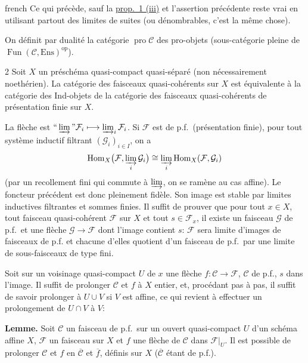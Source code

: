 \begin{hyphenrules}{french}
Ce qui pr\'ec\`ede, sauf la \hyperref[app:prop1]{prop.\ 1 (iii)} et l'assertion pr\'ec\'edente reste vrai en utilisant partout des limites de suites (ou d\'enombrables, c'est la m\^eme chose).

On d\'efinit par dualit\'e la cat\'egorie $\operatorname{pro}\mathcal{C}$ des pro-objets (sous-cat\'egorie pleine de $\operatorname{Fun}(\mathcal C,\mathrm{Ens})^{\mathrm{op}}$).

\begin{bookproposition}{2}\label{app:prop2}
Soit $X$ un pr\'esch\'ema quasi-compact quasi-s\'epar\'e (non n\'ecessairement noeth\'erien). La cat\'egorie des faisceaux quasi-coh\'erents sur $X$ est \'equivalente \`a la cat\'egorie des Ind-objets de la cat\'egorie des faisceaux quasi-coh\'erents de pr\'esentation finie sur $X$.
\end{bookproposition}

La fl\`eche est $\text{``}\varinjlim\text{''}\mathcal F_i\longmapsto\varinjlim_i\mathcal F_i$. Si $\mathcal F$ est de p.f.\ (pr\'esentation finie), pour tout syst\`eme inductif filtrant $(\mathcal G_i)_{i\in I}$, on a
\[
\operatorname{Hom}_X\bigl(\mathcal F,\varinjlim_i\mathcal G_i\bigr)
\cong\varinjlim_i\operatorname{Hom}_X(\mathcal F,\mathcal G_i)
\] (par un recollement fini qui commute \`a $\varinjlim$, on se ram\`ene au cas affine). Le foncteur pr\'ec\'edent est donc pleinement fid\`ele. Son image est stable par limites inductives filtrantes et sommes finies. Il suffit de prouver que pour tout $x\in X$, tout faisceau quasi-coh\'erent $\mathcal F$ sur $X$ et tout $s\in\mathcal F_x$, il existe un faisceau $\mathcal G$ de p.f.\ et une fl\`eche $\mathcal G\to\mathcal F$ dont l'image contient $s$: $\mathcal F$ sera limite d'images de faisceaux de p.f. et chacune d'elles quotient d'un faisceau de p.f.\ par une limite de sous-faisceaux de type fini.

Soit sur un voisinage quasi-compact $U$ de $x$ une fl\`eche $f: \mathcal{C} \longrightarrow \mathcal{F}$, $\mathcal{C}$ de p.f., $s$ dans l'image. Il suffit de prolonger $\mathcal{C}$ et $f$ \`a $X$ entier, et, proc\'edant pas \`a pas, il suffit de savoir prolonger \`a $U \cup V$ si $V$ est affine, ce qui revient \`a effectuer un prolongement de $U \cap V$ \`a $V$:

\par\medskip{}\label{app:extension-lemma}\noindent\textbf{Lemme.}
Soit $\mathcal{C}$ un faisceau de p.f.\ sur un ouvert quasi-compact $U$ d'un sch\'ema affine $X$, $\mathcal{F}$ un faisceau sur $X$ et $f$ une fl\`eche de $\mathcal{C}$ dans $\mathcal{F}|_U$. Il est possible de prolonger $\mathcal{C}$ et $f$ en $\overline{\mathcal{C}}$ et $\overline{f}$, d\'efinis sur $X$ ($\overline{\mathcal{C}}$ \'etant de p.f.).
\par\medskip


\end{hyphenrules}
